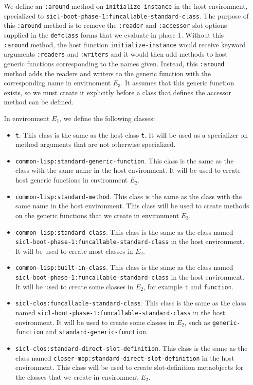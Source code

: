 We define an \texttt{:around} method on \texttt{initialize-instance}
in the host environment, specialized to
\texttt{sicl-boot-phase-1:funcallable-standard-class}.  The purpose of
this \texttt{:around} method is to remove the \texttt{:reader} and
\texttt{:accessor} slot options supplied in the \texttt{defclass}
forms that we evaluate in phase 1.  Without this \texttt{:around}
method, the host function \texttt{initialize-instance} would receive
keyword arguments \texttt{:readers} and \texttt{:writers} and it would
then add methods to host generic functions corresponding to the names
given.  Instead, this \texttt{:around} method adds the readers and
writers to the generic function with the corresponding name in
envirnoment $E_3$.  It assumes that this generic function exists, so
we must create it explicitly before a class that defines the accessor
method can be defined.

In environment $E_1$, we define the following classes:

\begin{itemize}
\item \texttt{t}.  This class is the same as the host class
  \texttt{t}.  It will be used as a specializer on method arguments
  that are not otherwise specialized.
\item \texttt{common-lisp:standard-generic-function}.  This class is
  the same as the class with the same name in the host environment.
  It will be used to create host generic functions in environment
  $E_2$.
\item \texttt{common-lisp:standard-method}.  This class is
  the same as the class with the same name in the host environment.
  This class will be used to create methods on the generic functions
  that we create in environment $E_3$.
\item \texttt{common-lisp:standard-class}.  This class is the same as
  the class named
  \texttt{sicl-boot-phase-1:funcallable-standard-class} in the host
  environment.  It will be used to create most classes in $E_2$.
\item \texttt{common-lisp:built-in-class}.  This class is the same as
  the class named
  \texttt{sicl-boot-phase-1:funcallable-standard-class} in the host
  environment.  It will be used to create some classes in $E_2$, for
  example \texttt{t} and \texttt{function}.
\item \texttt{sicl-clos:funcallable-standard-class}.  This class is
  the same as the class named
  \texttt{sicl-boot-phase-1:funcallable-standard-class} in the host
  environment.  It will be used to create some classes in $E_2$, such
  as \texttt{generic-function} and \texttt{standard-generic-function}.
\item \texttt{sicl-clos:standard-direct-slot-definition}.  This class
  is the same as the class named
  \texttt{closer-mop:standard-direct-slot-definition} in the host
  environment.  This class will be used to create slot-definition
  metaobjects for the classes that we create in environment $E_2$.
\end{itemize}

